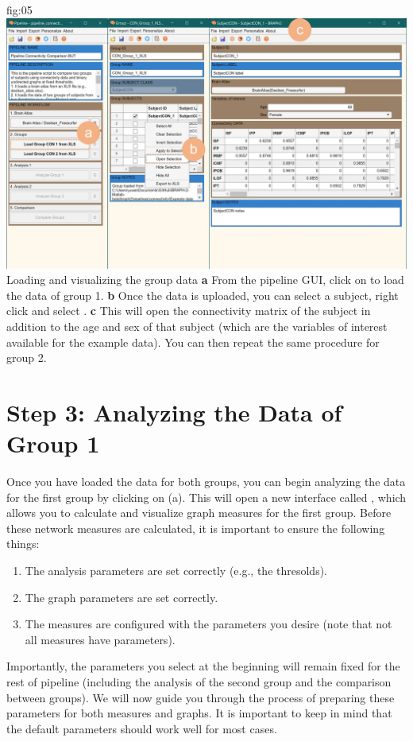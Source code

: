 \documentclass[justified]{tufte-handout}
\begin{document}
	{fig:05}
	{
	\includegraphics{fig05.jpg}
	}
	{Loading and visualizing the group data}
	{
	{\bf a} From the pipeline GUI, click on  to load the data of group 1.
	{\bf b} Once the data is uploaded, you can select a subject, right click and select .
	{\bf c} This will open the connectivity matrix of the subject in addition to the age and sex of that subject (which are the variables of interest available for the example data).
	You can then repeat the same procedure for group 2.
	}

\clearpage
\section{Step 3: Analyzing the Data of Group 1}

Once you have loaded the data for both groups, you can begin analyzing the data for the first group by clicking on  (a). 
This will open a new interface called , which allows you to calculate and visualize graph measures for the first group. 
Before these network measures are calculated, it is important to ensure the following things: 
\begin{enumerate}
	\item The analysis parameters are set correctly (e.g., the thresolds).
	\item The graph parameters are set correctly.
	\item The measures are configured with the parameters you desire (note that not all measures have parameters).
\end{enumerate}

Importantly, the parameters you select at the beginning will remain fixed for the rest of pipeline (including the analysis of the second group and the comparison between groups). We will now guide you through the process of preparing these parameters for both measures and graphs. It is important to keep in mind that the default parameters should work well for most cases.
\end{document}
